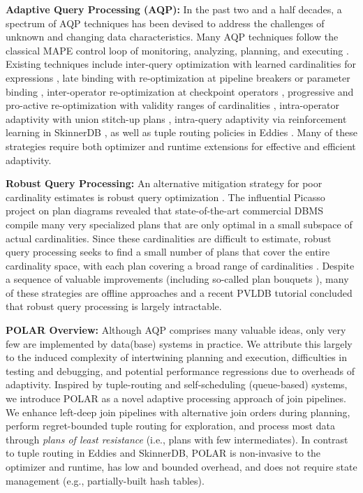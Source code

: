 \textbf{Adaptive Query Processing (AQP):} In the past two and a half decades, a spectrum of AQP techniques \cite{BabuB05,DeshpandeIR07,IvesDR07,DeshpandeHR06} has been devised to address the challenges of unknown and changing data characteristics. Many AQP techniques follow the classical MAPE control loop of monitoring, analyzing, planning, and executing \cite{IvesDR07,mape05,AboulnagaHLLMPR04}. Existing techniques include inter-query optimization with learned cardinalities for expressions \cite{BrunoC02,ChenR94,StillgerLMK01}, late binding with re-optimization at pipeline breakers \cite{DeshpandeHR06} or parameter binding \cite{BizarroBD09}, inter-operator re-optimization at checkpoint operators \cite{KabraD98}, progressive and pro-active re-optimization with validity ranges of cardinalities \cite{MarklRSLP04,BabuBD05}, intra-operator adaptivity with union stitch-up plans \cite{IvesHW04}, intra-query adaptivity via reinforcement learning in SkinnerDB \cite{TrummerWMMJA19,TrummerWWMMJAR21,WeiT22}, as well as tuple routing policies in Eddies \cite{HellersteinA00,Arpaci-Dusseau03,Deshpande04,BizarroBDW05}. Many of these strategies require both optimizer and runtime extensions for effective and efficient adaptivity.

\textbf{Robust Query Processing:} An alternative mitigation strategy for poor cardinality estimates is robust query optimization \cite{Haritsa20}. The influential Picasso project \cite{Haritsa10} on plan diagrams \cite{ReddyH05} revealed that state-of-the-art commercial DBMS compile many very specialized plans that are only optimal in a small subspace of actual cardinalities. Since these cardinalities are difficult to estimate, robust query processing seeks to find a small number of plans that cover the entire cardinality space, with each plan covering a broad range of cardinalities \cite{DDH07,DDH08}. Despite a sequence of valuable improvements \cite{DDH08,AbhiramaBDSH10,GraefeGKP12,DuttH14} (including so-called plan bouquets \cite{DuttH14}), many of these strategies are offline approaches and a recent PVLDB tutorial \cite{Haritsa20} concluded that robust query processing is largely intractable. 

\textbf{POLAR Overview:} Although AQP comprises many valuable ideas, only very few are implemented by data(base) systems in practice. We attribute this largely to the induced complexity of intertwining planning and execution, difficulties in testing and debugging, and potential performance regressions due to overheads of adaptivity. Inspired by tuple-routing and self-scheduling (queue-based) systems, we introduce POLAR as a novel adaptive processing approach of join pipelines. We enhance left-deep join pipelines with alternative join orders during planning, perform regret-bounded tuple routing for exploration, and process most data through \emph{plans of least resistance} (i.e., plans with few intermediates). In contrast to tuple routing in Eddies and SkinnerDB, POLAR is non-invasive to the optimizer and runtime, has low and bounded overhead, and does not require state management (e.g., partially-built hash tables).

